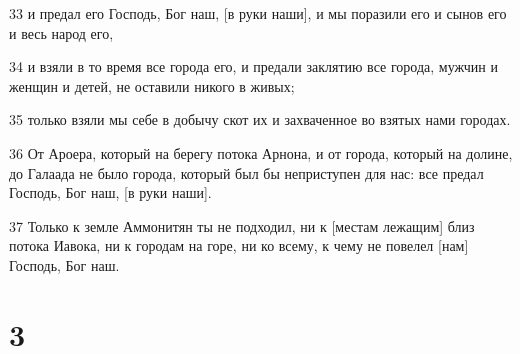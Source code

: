 \par 33 и предал его Господь, Бог наш, [в руки наши], и мы поразили его и сынов его и весь народ его,
\par 34 и взяли в то время все города его, и предали заклятию все города, мужчин и женщин и детей, не оставили никого в живых;
\par 35 только взяли мы себе в добычу скот их и захваченное во взятых нами городах.
\par 36 От Ароера, который на берегу потока Арнона, и от города, который на долине, до Галаада не было города, который был бы неприступен для нас: все предал Господь, Бог наш, [в руки наши].
\par 37 Только к земле Аммонитян ты не подходил, ни к [местам лежащим] близ потока Иавока, ни к городам на горе, ни ко всему, к чему не повелел [нам] Господь, Бог наш.

\chapter{3}

